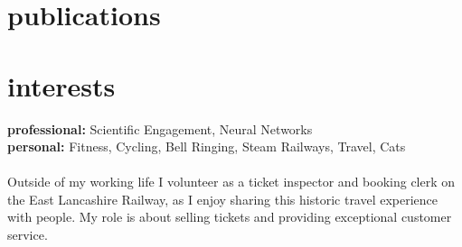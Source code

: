 \documentclass[]{cv-style}          %
\begin{document}
\section{publications}
\begin{entrylist}
\end{entrylist}

\section{interests}
  \vspace{-0.2cm}

\textbf{professional:} Scientific Engagement, Neural Networks\\
\textbf{personal:} Fitness, Cycling, Bell Ringing, Steam Railways, Travel, Cats\\
\\
Outside of my working life I volunteer as a ticket inspector and booking clerk on the East Lancashire Railway, as I enjoy sharing this historic travel experience with people. My role is about selling tickets and providing exceptional customer service.
\end{document}
